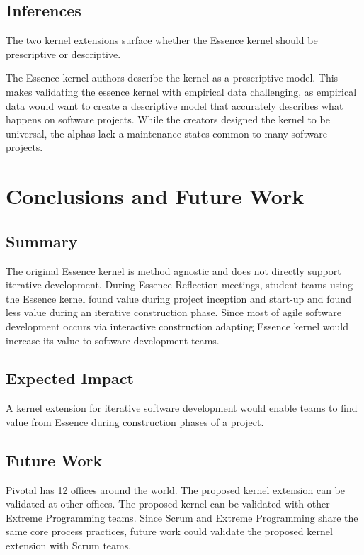 \documentclass[preprint,12pt,3p]{elsarticle}
\begin{document}
\subsection{Inferences}

The two kernel extensions surface whether the Essence kernel should be prescriptive or descriptive.

The Essence kernel authors describe the kernel as a prescriptive model. This makes validating the essence kernel with empirical data challenging, as empirical data would want to create a descriptive model that accurately describes what happens on software projects. While the creators designed the kernel to be universal, the alphas lack a maintenance states common to many software projects.

\section{Conclusions and Future Work}
\label{Conclusions}

\subsection{Summary}
The original Essence kernel is method agnostic and does not directly support iterative development. During Essence Reflection meetings, student teams using the Essence kernel found value during project inception and start-up and found less value during an iterative construction phase. Since most of agile software development occurs via interactive construction adapting Essence kernel would increase its value to software development teams.

\subsection{Expected Impact}
A kernel extension for iterative software development would enable teams to find value from Essence during construction phases of a project.

\subsection{Future Work}
Pivotal has 12 offices around the world. The proposed kernel extension can be validated at other offices. The proposed kernel can be validated with other Extreme Programming teams. Since Scrum and Extreme Programming share the same core process practices, future work could validate the proposed kernel extension with Scrum teams.
\end{document}
